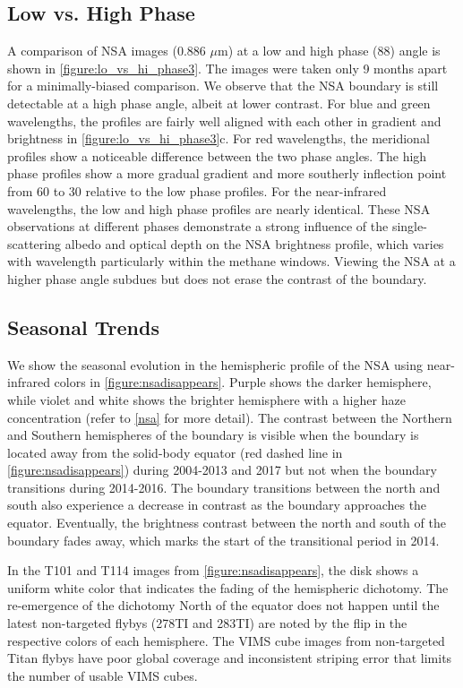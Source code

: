 \documentclass[apj,tighten]{emulateapj}
\begin{document}
\subsection{Low vs. High Phase}


A comparison of NSA images (0.886 $\mu$m) at a low and high phase (88\degree{}) angle is shown in \autoref{figure:lo_vs_hi_phase3}.
The images were taken only 9 months apart for a minimally-biased comparison.
We observe that the NSA boundary is still detectable at a high phase angle, albeit at lower contrast. 
For blue and green wavelengths, the profiles are fairly well aligned with each other in gradient and brightness in \autoref{figure:lo_vs_hi_phase3}c.
For red wavelengths, the meridional profiles show a noticeable difference between the two phase angles.
The high phase profiles show a more gradual gradient and more southerly inflection point from 60 to 30 relative to the low phase profiles.
For the near-infrared wavelengths, the low and high phase profiles are nearly identical. 
These NSA observations at different phases demonstrate a strong influence of the single-scattering albedo and optical depth on the NSA brightness profile, which varies with wavelength particularly within the methane windows.
Viewing the NSA at a higher phase angle subdues but does not erase the contrast of the boundary. 

\subsection{Seasonal Trends}

We show the seasonal evolution in the hemispheric profile of the NSA using near-infrared colors in \autoref{figure:nsadisappears}.
Purple shows the darker hemisphere, while violet and white shows the brighter hemisphere with a higher haze concentration (refer to \autoref{nsa} for more detail). 
The contrast between the Northern and Southern hemispheres of the boundary is visible when the boundary is located away from the solid-body %
equator (red dashed line in \autoref{figure:nsadisappears}) during 2004-2013 and 2017 but not when the boundary transitions during 2014-2016.  
The boundary transitions between the north and south also experience a decrease in contrast as the boundary approaches the equator.
Eventually, the brightness contrast between the north and south of the boundary fades away, which marks the start of the transitional period in 2014. 

In the T101 and T114 images from \autoref{figure:nsadisappears}, the disk shows a uniform white color that indicates the fading of the hemispheric dichotomy.
The re-emergence of the dichotomy North of the equator does not happen until the latest non-targeted flybys (278TI and 283TI) are noted by the flip in the respective colors of each hemisphere.
The VIMS cube images from non-targeted Titan flybys have poor global coverage and inconsistent striping error that limits the number of usable VIMS cubes.
\end{document}
